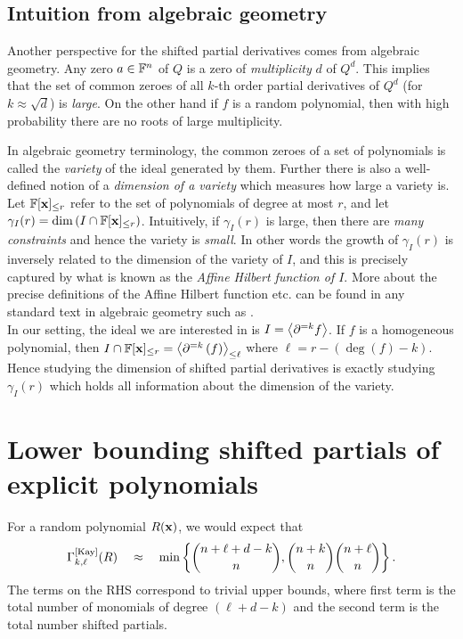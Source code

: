 \subsection*{Intuition from algebraic geometry}

Another perspective for the shifted partial derivatives comes from algebraic geometry. 
Any zero $a\in \mathbb{F}^n$ of $Q$ is a zero of \emph{multiplicity} $d$ of $Q^d$. 
This implies that the set of common zeroes of all $k$-th order partial derivatives of $Q^d$ (for $k \approx  \sqrt{d}$) is \emph{large}. 
On the other hand if $f$ is a random polynomial, then with high probability there are no roots of large multiplicity. 

In algebraic geometry terminology, the common zeroes of a set of polynomials is called the \emph{variety} of the ideal generated by them. 
Further there is also a well-defined notion of a \emph{dimension of a variety} which measures how large a variety is. 
Let $\mathbb{F}[\mathbf{x}]_{\leq r}$ refer to the set of polynomials of degree at most $r$, and let $\gamma_I(r) = \dim \left(I \cap \mathbb{F}[\mathbf{x}]_{\leq r}\right)$. 
Intuitively, if $\gamma_I(r)$ is large, then there are \emph{many constraints} and hence the variety is \emph{small}. 
In other words the growth of $\gamma_I(r)$ is inversely related to the dimension of the variety of $I$, and this is precisely captured by what is known as the \emph{Affine Hilbert function of $I$}. 
More about the precise definitions of the Affine Hilbert function etc. can be found in any standard text in algebraic geometry such as \cite{clo}. \\

In our setting, the ideal we are interested in is $I = \left\langle\partial^{=k}f\right\rangle$. 
If $f$ is a homogeneous polynomial, then $I \cap \mathbb{F}[\mathbf{x}]_{\leq r} = \left\langle\partial^{=k}\left(f\right)\right\rangle_{\leq \ell}$ where $\ell = r - (\deg(f) - k)$. 
Hence studying the dimension of shifted partial derivatives is exactly studying $\gamma_I(r)$ which holds all information about the dimension of the variety. 

\section{Lower bounding shifted partials of explicit polynomials}

For a random polynomial $R(\mathbf{x})$, we would expect that
$$
\Gamma^{\mathrm{[Kay]}}_{k,\ell}(R) \quad \approx \quad \min\left\{\binom{n + \ell + d -k}{n}, \binom{n+k}{n} \binom{n+\ell}{n}\right\}.
$$
The terms on the RHS correspond to trivial upper bounds, where first term is the total number of monomials of degree $(\ell + d-k)$ and the second term is the total number shifted partials.  

